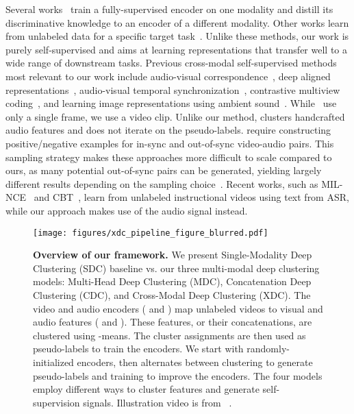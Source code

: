 \documentclass{article}
\begin{document}
\vspace{-3pt} 
Several works~\cite{aytar2016soundnet,gupta2016cross} train a fully-supervised encoder on one modality and distill its discriminative knowledge to an encoder of a different modality.
Other works learn from unlabeled data for a specific target task~\cite{zhao2018sound,rouditchenko2019self}. 
Unlike these methods, our work is purely self-supervised and aims at learning representations that transfer well to a wide range of downstream tasks.
Previous cross-modal self-supervised methods most relevant to our work include audio-visual correspondence~\cite{Arandjelovic17}, deep aligned representations~\cite{aytar2017see}, audio-visual temporal synchronization~\cite{avts,owens2018audio}, contrastive multiview coding~\cite{tian2020contrastive}, and learning image representations using ambient sound~\cite{owens2016ambient}.
While~\cite{Arandjelovic17,aytar2017see,owens2016ambient,tian2020contrastive} use only a single frame, we use a video clip. Unlike our method, \cite{owens2016ambient} clusters handcrafted audio features and does not iterate on the pseudo-labels.
\cite{avts,owens2018audio} require constructing positive/negative examples for in-sync and out-of-sync video-audio pairs. This sampling strategy makes these approaches more difficult to scale compared to ours, as many potential out-of-sync pairs can be generated, yielding largely different results depending on the sampling choice~\cite{avts}. 
Recent works, such as MIL-NCE~\cite{miech2020end} and CBT~\cite{sun2019learning}, learn from unlabeled instructional videos using text from ASR, while our approach makes use of the audio signal instead.
 \begin{figure}[t]
  \centering
  \texttt{[image: figures/xdc\_pipeline\_figure\_blurred.pdf]}
  \vspace{-16pt}
  \caption{\textbf{Overview of our framework.} We present Single-Modality Deep Clustering (SDC) baseline vs. our three multi-modal deep clustering models: Multi-Head Deep Clustering (MDC), Concatenation Deep Clustering (CDC), and Cross-Modal Deep Clustering (XDC). 
  The video and audio encoders ( and ) map unlabeled videos to visual and audio features ( and ). These features, or their concatenations, are clustered using -means. The cluster assignments are then used as pseudo-labels to train the encoders. We start with randomly-initialized encoders, then alternates between clustering to generate pseudo-labels and training to improve the encoders. The four models employ different ways to cluster features and generate self-supervision signals. Illustration video is from ~\cite{cc_video_pictures}.} 
  
  \vspace{-8pt}
  \label{fig:pipeline_fig}
\end{figure}
\end{document}
